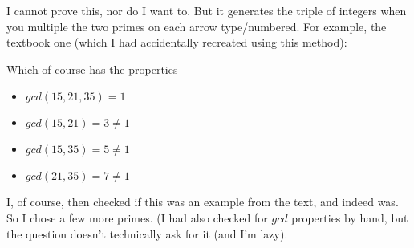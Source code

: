 \documentclass[12pt]{article}
\begin{document}
\begin{center}
\end{center}

I cannot prove this, nor do I want to. But it generates the triple of integers when you multiple the two primes on each arrow type/numbered. For example, the textbook one (which I had accidentally recreated using this method):

\begin{center}
\end{center}

Which of course has the properties
\begin{itemize}
\item $gcd(15,21,35)=1$
\item $gcd(15,21)=3\neq1$
\item $gcd(15,35)=5\neq1$
\item $gcd(21,35)=7\neq1$
\end{itemize}

I, of course, then checked if this was an example from the text, and indeed was. So I chose a few more primes. (I had also checked for $gcd$ properties by hand, but the question doesn't technically ask for it (and I'm lazy).
\end{document}

